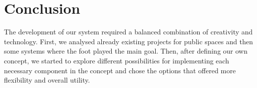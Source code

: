 \section{Conclusion}
The development of our system required a balanced combination of creativity and technology. First, we analysed already existing projects for public spaces and then some systems where the foot played the main goal. Then, after defining our own concept, we started to explore different possibilities for implementing each necessary component in the concept and chose the options that offered more flexibility and overall utility. 



